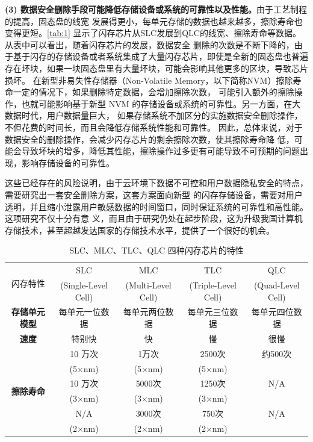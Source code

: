 \textbf{(3) 数据安全删除手段可能降低存储设备或系统的可靠性以及性能。}由于工艺制程的提高，固态盘的线宽
发展得更小，每单元存储的数据也越来越多，擦除寿命也变得更短\cite{Yaakobi2012Characterization,Shibata2012A}。\autoref{tab:1}
显示了闪存芯片从SLC发展到QLC的线宽、擦除寿命等数据。从表中可以看出，随着闪存芯片的发展，数据安全
删除的次数是不断下降的，由于基于闪存的存储设备或者系统集成了大量闪存芯片，即使是全新的固态盘也普遍
存在坏块，如果一块固态盘里有大量坏块，可能会影响其他更多的区块，导致芯片损坏\cite{Schroeder2016Flash}。
在新型非易失性存储器（Non-Volatile Memory，以下简称NVM）擦除寿命一定的情况下，如果删除特定数据，会增加擦除次数，
可能引入额外的擦除操作，也就可能影响基于新型 NVM 的存储设备或系统的可靠性。另一方面，在大数据时代，用户数据量巨大，
如果存储系统不加区分的实施数据安全删除操作，不但花费的时间长，而且会降低存储系统性能和可靠性。
因此，总体来说，对于数据安全的删除操作，会减少闪存芯片的剩余擦除次数，使其擦除寿命降
低，可能会导致坏块的增多，降低其性能，擦除操作过多更有可能导致不可预期的问题出现，影响存储设备的可靠性。

这些已经存在的风险说明，由于云环境下数据不可控和用户数据隐私安全的特点，需要研究出一套安全删除方案，这套方案面向新型
的闪存存储设备，需要对用户透明，并且缩小泄露用户敏感数据的时间窗口，同时保证系统的可靠性和高性能。这项研究不仅十分有意
义，而且由于研究仍处在起步阶段，这为升级我国计算机存储技术，甚至超越发达国家的存储技术水平，提供了一个很好的机会。
\begin{table}
\centering
\caption{SLC、MLC、TLC、QLC 四种闪存芯片的特性}\label{tab:1}
    \begin{tabular}{|*{5}{c|}}
\hline
    \multirow{2}{*}{闪存特性} & SLC & MLC & TLC & QLC \\
    & (Single-Level Cell) & (Multi-Level Cell) & (Triple-Level Cell) & (Quad-Level Cell) \\
\hline
    \textbf{存储单元模型} & 每单元一位数据 & 每单元两位数据 & 每单元三位数据 & 每单元四位数据 \\
\hline
    \textbf{速度} & 特别快 & 快 & 慢 & 很慢 \\
\hline
    \multirow{6}{*}{\textbf{擦除寿命}} & 10 万次 & 1万次 & 2500次 & 约500次 \\ %
        & (5×nm) & (5×nm) & (5×nm) & \\ \cline{2-5}
    & 10 万次 & 5000次 & 1250次 & N/A \\%
        & (3×nm) & (3×nm) & (3×nm) &\\ \cline{2-5}
    & N/A & 3000次 & 750次 & N/A \\ %
        & (2×nm) & (2×nm) & (2×nm) & \\ \hline
\end{tabular}
\end{table}


